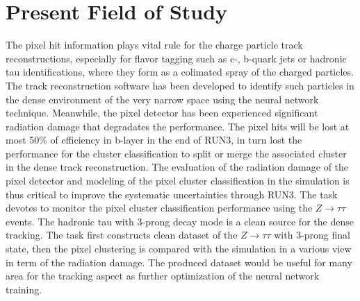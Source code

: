 \documentclass{article}
\begin{document}
\section{Present Field of Study}

The pixel hit information plays vital rule for the charge particle track reconstructions,
especially for flavor tagging such as c-, b-quark jets or hadronic tau identifications, where
they form as a colimated spray of the charged particles. The track reconstruction software
has been developed to identify such particles in the dense environment of the very narrow
space using the neural network technique. Meanwhile, the pixel detector has been experienced
significant radiation damage that degradates the performance. The pixel hits will be lost at
most 50\% of efficiency in b-layer in the end of RUN3, in turn lost the performance for the
cluster classification to split or merge the associated cluster in the dense track reconstruction.
The evaluation of the radiation damage of the pixel detector and modeling of the pixel cluster
classification in the simulation is thus critical to improve the systematic uncertainties through
RUN3.
The task devotes to monitor the pixel cluster classification performance using the
$Z \rightarrow \tau \tau$ events. The hadronic tau with 3-prong decay mode is a clean source for the dense
tracking. The task first constructs clean dataset of the $Z \rightarrow \tau \tau$ with 3-prong final state, then
the pixel clustering is compared with the simulation in a various view in term of the radiation
damage. The produced dataset would be useful for many area for the tracking aspect as further
optimization of the neural network training.


\end{document}
